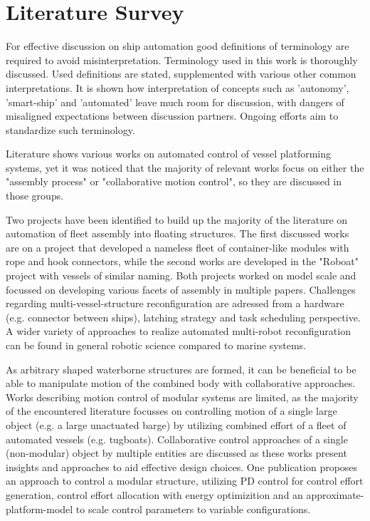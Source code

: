 \section*{Literature Survey}
For effective discussion on ship automation good definitions of terminology are required to avoid misinterpretation. Terminology used in this work is thoroughly discussed. Used definitions are stated, supplemented with various other common interpretations. It is shown how interpretation of concepts such as 'autonomy', 'smart-ship' and 'automated' leave much room for discussion, with dangers of misaligned expectations between discussion partners. Ongoing efforts aim to standardize such terminology.

Literature shows various works on automated control of vessel platforming systems, yet it was noticed that the majority of relevant works focus on either the "assembly process" or "collaborative motion control", so they are discussed in those groups. 

Two projects have been identified to build up the majority of the literature on automation of fleet assembly into floating structures. The first discussed works are on a project that developed a nameless fleet of container-like modules with rope and hook connectors, while the second works are developed in the "Roboat" project with vessels of similar naming. Both projects worked on model scale and focussed on developing various facets of assembly in multiple papers. Challenges regarding multi-vessel-structure reconfiguration are adressed from a hardware (e.g. connector between ships), latching strategy and task scheduling perspective.  A wider variety of approaches to realize automated multi-robot reconfiguration can be found in general robotic science compared to marine systems.

As arbitrary shaped waterborne structures are formed, it can be beneficial to be able to manipulate motion of the combined body with collaborative approaches. Works describing motion control of modular systems are limited, as the majority of the encountered literature focusses on controlling motion of a single large object  (e.g. a large unactuated barge) by utilizing combined effort of  a fleet of automated vessels (e.g. tugboats). Collaborative control approaches of a single (non-modular) object by multiple entities are discussed as these works present insights and approaches to aid effective design choices. One publication proposes an approach to control a modular structure, utilizing PD control for control effort generation, control effort allocation with energy optimizition and an approximate-platform-model to scale control parameters to variable configurations. 

